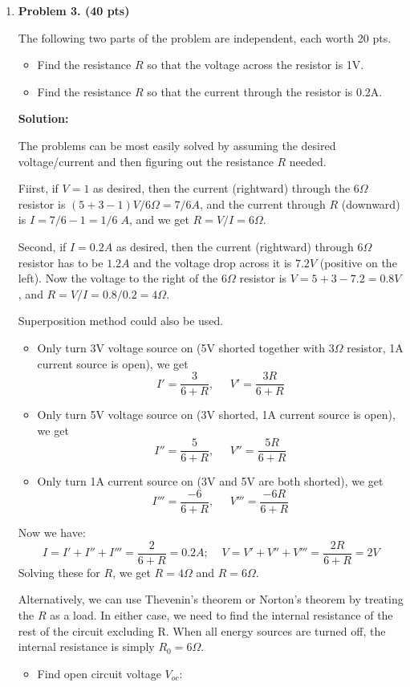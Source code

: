 \begin{enumerate}
\item {\bf Problem 3. (40 pts)}

  The following two parts of the problem are independent, each worth 20 pts.
  \begin{itemize}
    \item Find the resistance $R$ so that the voltage across the resistor is 1V.
    \item Find the resistance $R$ so that the current through the resistor is 0.2A.
  \end{itemize}

  
  {\bf Solution:} 

  The problems can be most easily solved by assuming the desired voltage/current
  and then figuring out the resistance $R$ needed. 

  Fiirst, if $V=1$ as desired, then the current (rightward) through the $6\Omega$ 
  resistor is $(5+3-1)V/6\Omega=7/6A$, and the current through $R$ (downward) is 
  $I=7/6-1=1/6\;A$, and we get $R=V/I=6\Omega$. 

  Second, if $I=0.2A$ as desired, then the current (rightward) through $6\Omega$
  resistor has to be $1.2A$ and the voltage drop across it is $7.2V$ (positive on
  the left). Now the voltage to the right of the $6\Omega$ resistor is $V=5+3-7.2=0.8V$,
  and $R=V/I=0.8/0.2=4\Omega$.

  Superposition method could also be used. 
  \begin{itemize}
    \item Only turn 3V voltage source on (5V shorted together with $3\Omega$ resistor, 1A
      current source is open), we get
      \[ I'=\frac{3}{6+R},\;\;\;\;\; V'=\frac{3R}{6+R} \]
    \item Only turn 5V voltage source on (3V shorted, 1A current source is open), we get
      \[ I''=\frac{5}{6+R},\;\;\;\;\; V''=\frac{5R}{6+R} \]
    \item Only turn 1A current source on (3V and 5V are both shorted), we get
      \[ I'''=\frac{-6}{6+R},\;\;\;\;\; V'''=\frac{-6R}{6+R} \]
  \end{itemize}
  Now we have:
  \[ I=I'+I''+I'''=\frac{2}{6+R}=0.2A;\;\;\;\; V=V'+V''+V'''=\frac{2R}{6+R}=2V \]
  Solving these for $R$, we get $R=4\Omega$ and $R=6\Omega$.

  Alternatively, we can use Thevenin's theorem or Norton's theorem by treating the 
  $R$ as a load. In either case, we need to find the internal resistance of the rest
  of the circuit excluding R. When all energy sources are turned off, the internal 
  resistance is simply $R_0=6\Omega$. 
  \begin{itemize}
    \item Find open circuit voltage $V_{oc}$:


\end{itemize}
\end{enumerate}

